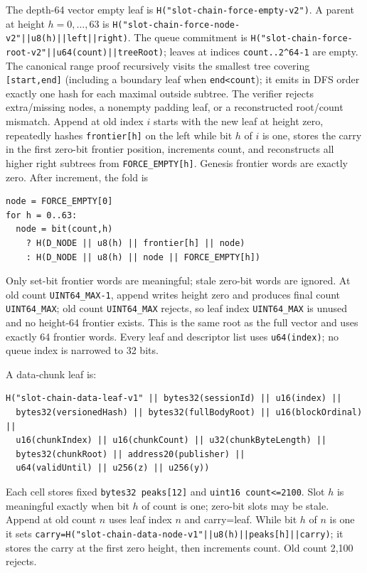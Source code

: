 \documentclass[a4paper,11pt]{article}
\newcommand{\code}[1]{\nolinkurl{#1}}
\begin{document}
The depth-64 vector empty leaf is \code{H("slot-chain-force-empty-v2")}.
A parent at height $h=0,\ldots,63$ is
\code{H("slot-chain-force-node-v2"||u8(h)||left||right)}.  The queue commitment
is \code{H("slot-chain-force-root-v2"||u64(count)||treeRoot)}; leaves at indices
\code{count..2^64-1} are empty.  The canonical range proof recursively visits
the smallest tree covering \code{[start,end]} (including a boundary leaf when
\code{end<count}); it emits in DFS order exactly one hash for each maximal
outside subtree.  The verifier rejects extra/missing nodes, a nonempty padding
leaf, or a reconstructed root/count mismatch.
Append at old index $i$ starts with the new leaf at height zero, repeatedly
hashes \code{frontier[h]} on the left while bit $h$ of $i$ is one, stores the
carry in the first zero-bit frontier position, increments count, and reconstructs
all higher right subtrees from \code{FORCE_EMPTY[h]}.  Genesis frontier words
are exactly zero.  After increment, the fold is
\begin{verbatim}
node = FORCE_EMPTY[0]
for h = 0..63:
  node = bit(count,h)
    ? H(D_NODE || u8(h) || frontier[h] || node)
    : H(D_NODE || u8(h) || node || FORCE_EMPTY[h])
\end{verbatim}
Only set-bit frontier words are meaningful; stale zero-bit words are ignored.
At old count \code{UINT64_MAX-1}, append writes height zero and produces final
count \code{UINT64_MAX}; old count \code{UINT64_MAX} rejects, so leaf index
\code{UINT64_MAX} is unused and no height-64 frontier exists.  This is the same
root as the full vector and uses exactly 64 frontier words.  Every leaf and
descriptor list uses \code{u64(index)}; no queue index is narrowed to 32 bits.

A data-chunk leaf is:
\begin{verbatim}
H("slot-chain-data-leaf-v1" || bytes32(sessionId) || u16(index) ||
  bytes32(versionedHash) || bytes32(fullBodyRoot) || u16(blockOrdinal) ||
  u16(chunkIndex) || u16(chunkCount) || u32(chunkByteLength) ||
  bytes32(chunkRoot) || address20(publisher) ||
  u64(validUntil) || u256(z) || u256(y))
\end{verbatim}
Each cell stores fixed \code{bytes32 peaks[12]} and \code{uint16 count<=2100}.
Slot $h$ is meaningful exactly when bit $h$ of count is one; zero-bit slots may
be stale.  Append at old count $n$ uses leaf index $n$ and carry=leaf.  While bit
$h$ of $n$ is one it sets
\code{carry=H("slot-chain-data-node-v1"||u8(h)||peaks[h]||carry)}; it stores the
carry at the first zero height, then increments count.  Old count 2,100 rejects.
\end{document}

